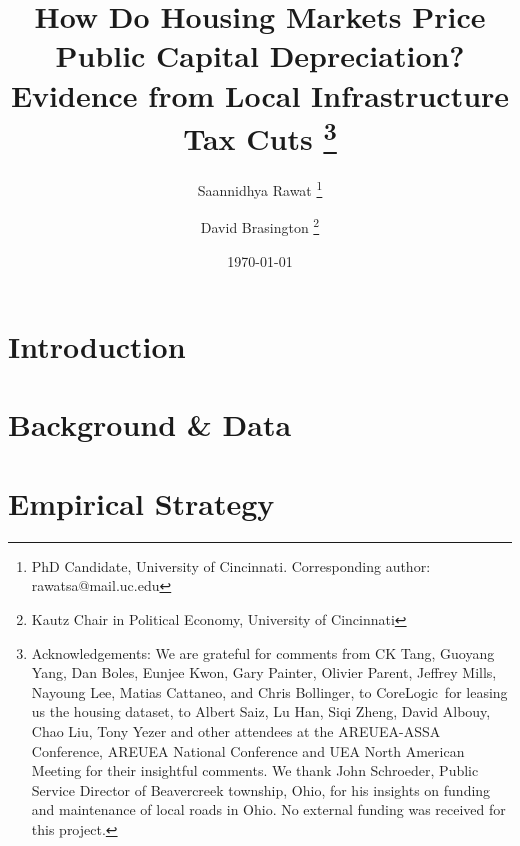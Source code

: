 \documentclass[12pt]{article}
\begin{document}
\begin{titlepage}
\title{How Do Housing Markets Price Public Capital Depreciation?\\
Evidence from Local Infrastructure Tax Cuts%
\thanks{Acknowledgements: We are grateful for comments from CK Tang, Guoyang Yang, Dan Boles, Eunjee Kwon, Gary Painter, Olivier Parent, Jeffrey Mills, Nayoung Lee, Matias Cattaneo, and Chris Bollinger, to CoreLogic\textregistered\ for leasing us the housing dataset, to Albert Saiz, Lu Han, Siqi Zheng, David Albouy, Chao Liu, Tony Yezer and other attendees at the AREUEA-ASSA Conference, AREUEA National Conference and UEA North American Meeting for their insightful comments. We thank John Schroeder, Public Service Director of Beavercreek township, Ohio, for his insights on funding and maintenance of local roads in Ohio. No external funding was received for this project.}}
\author{Saannidhya Rawat \thanks{PhD Candidate, University of Cincinnati. Corresponding author: rawatsa@mail.uc.edu} \and David Brasington \thanks{Kautz Chair in Political Economy, University of Cincinnati}}
\date{\today}
\maketitle

\vspace{-2em}

\begin{abstract}

\bigskip
\end{abstract}
\setcounter{page}{0}
\thispagestyle{empty}
\end{titlepage}
\pagebreak \newpage

\doublespacing

\section{Introduction} \label{sec:introduction}




\section{Background \& Data} \label{sec:data}


\section{Empirical Strategy} \label{sec:empirical}

\end{document}
